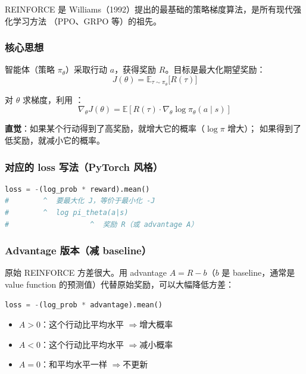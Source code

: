 REINFORCE 是 Williams（1992）提出的最基础的策略梯度算法，是所有现代强化学习方法
（PPO、GRPO 等）的祖先。

\subsubsection{核心思想}

智能体（策略 $\pi_\theta$）采取行动 $a$，获得奖励 $R$。目标是最大化期望奖励：
\[
    J(\theta) = \mathbb{E}_{\tau \sim \pi_\theta}\bigl[R(\tau)\bigr]
\]

对 $\theta$ 求梯度，利用 ：
\[
    \nabla_\theta J(\theta)
    = \mathbb{E}\!\left[R(\tau) \cdot \nabla_\theta \log \pi_\theta(a \mid s)\right]
\]

\begin{intubox}
\textbf{直觉}：如果某个行动得到了高奖励，就增大它的概率（$\log\pi$ 增大）；
如果得到了低奖励，就减小它的概率。
\end{intubox}

\subsubsection{对应的 loss 写法（PyTorch 风格）}

\begin{lstlisting}[language=Python]
loss = -(log_prob * reward).mean()
#        ^  要最大化 J，等价于最小化 -J
#        ^  log pi_theta(a|s)
#                   ^  奖励 R（或 advantage A）
\end{lstlisting}

\subsubsection{Advantage 版本（减 baseline）}

原始 REINFORCE 方差很大。用 advantage $A = R - b$（$b$ 是 baseline，通常是 value
function 的预测值）代替原始奖励，可以大幅降低方差：

\begin{lstlisting}[language=Python]
loss = -(log_prob * advantage).mean()
\end{lstlisting}

\begin{conceptbox}
\begin{itemize}
    \item $A > 0$：这个行动比平均水平 \quad$\Rightarrow$\quad 增大概率
    \item $A < 0$：这个行动比平均水平 \quad$\Rightarrow$\quad 减小概率
    \item $A = 0$：和平均水平一样 \quad$\Rightarrow$\quad 不更新
\end{itemize}
\end{conceptbox}

